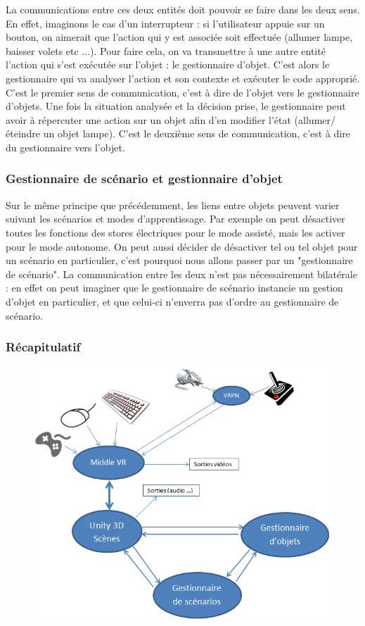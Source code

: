 La communications entre ces deux entités doit pouvoir se faire dans les deux sens. En effet, imaginons le cas d'un interrupteur : si l'utilisateur appuie sur un bouton, on aimerait que l'action qui y est associée soit effectuée (allumer lampe, baisser volets etc ...). Pour faire cela, on va transmettre à une autre entité l'action qui s'est exécutée sur l'objet : le gestionnaire d'objet. C'est alors le gestionnaire qui va analyser l'action et son contexte et exécuter le code approprié. C'est le premier sens de communication, c'est à dire de l'objet vers le gestionnaire d'objets.
Une fois la situation analysée et la décision prise, le gestionnaire peut avoir à répercuter une action sur un objet afin d'en modifier l'état (allumer/éteindre un objet lampe). C'est le deuxième sens de communication, c'est à dire du gestionnaire vers l'objet.

\subsubsection{Gestionnaire de scénario et gestionnaire d'objet}

Sur le même principe que précédemment, les liens entre objets peuvent varier suivant les scénarios et modes d'apprentissage. Par exemple on peut désactiver toutes les fonctions des stores électriques pour le mode assisté, mais les activer pour le mode autonome. On peut aussi décider de désactiver tel ou tel objet pour un scénario en particulier, c'est pourquoi nous allons passer par un "gestionnaire de scénario". La communication entre les deux n'est pas nécessairement bilatérale : en effet on peut imaginer que le gestionnaire de scénario instancie un gestion d'objet en particulier, et que celui-ci n'enverra pas d'ordre au gestionnaire de scénario.

\subsubsection{Récapitulatif}
\begin{figure}
	\centering
		\includegraphics[width=\textwidth]{2-Specifications/img/recap.png}
	\label{fig:unityvr}
\end{figure}





